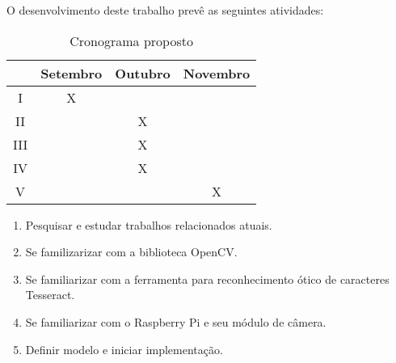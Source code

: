 
O desenvolvimento deste trabalho prevê as seguintes atividades:

\begin{table}[H]
\centering
\label{tab:crono}
\begin{tabular}{c|c|c|c}
    & Setembro & Outubro & Novembro \\ \hline
I   & X        &         &          \\
II  &          & X       &          \\
III &          & X       &          \\
IV  &          & X       &          \\
V   &          &         & X       
\end{tabular}
\caption{Cronograma proposto}
\end{table}

\begin{enumerate}[I]
	\item Pesquisar e estudar trabalhos relacionados atuais.
	\item Se familizarizar com a biblioteca OpenCV\@.
	\item Se familiarizar com a ferramenta para reconhecimento ótico de caracteres Tesseract.
	\item Se familiarizar com o Raspberry Pi e seu módulo de câmera.
	\item Definir modelo e iniciar implementação.
\end{enumerate}

